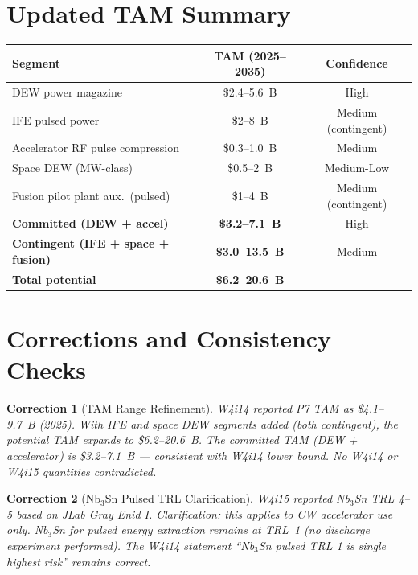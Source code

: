 \documentclass[11pt]{article}
\newtheorem{correction}{Correction}
\begin{document}
\section{Updated TAM Summary}
\label{sec:tam}

\begin{center}
\begin{tabular}{lcc}
\toprule
Segment & TAM (2025--2035) & Confidence \\
\midrule
DEW power magazine & \$2.4--5.6~B & High \\
IFE pulsed power & \$2--8~B & Medium (contingent) \\
Accelerator RF pulse compression & \$0.3--1.0~B & Medium \\
Space DEW (MW-class) & \$0.5--2~B & Medium-Low \\
Fusion pilot plant aux.\ (pulsed) & \$1--4~B & Medium (contingent) \\
\midrule
\textbf{Committed (DEW + accel)} & \textbf{\$3.2--7.1~B} & High \\
\textbf{Contingent (IFE + space + fusion)} & \textbf{\$3.0--13.5~B} & Medium \\
\textbf{Total potential} & \textbf{\$6.2--20.6~B} & --- \\
\bottomrule
\end{tabular}
\end{center}

\section{Corrections and Consistency Checks}
\label{sec:corrections}

\begin{correction}[TAM Range Refinement]
\label{corr:tam}
W4i14 reported P7 TAM as \$4.1--9.7~B (2025). With IFE and space
DEW segments added (both contingent), the potential TAM expands to
\$6.2--20.6~B. The committed TAM (DEW + accelerator) is
\$3.2--7.1~B --- consistent with W4i14 lower bound. No W4i14 or
W4i15 quantities contradicted.
\end{correction}

\begin{correction}[Nb$_3$Sn Pulsed TRL Clarification]
\label{corr:trl}
W4i15 reported Nb$_3$Sn TRL 4--5 based on JLab Gray Enid I.
Clarification: this applies to CW \emph{accelerator} use only.
Nb$_3$Sn for \emph{pulsed energy extraction} remains at TRL~1
(no discharge experiment performed). The W4i14 statement
``Nb$_3$Sn pulsed TRL 1 is single highest risk'' remains correct.
\end{correction}
\end{document}

